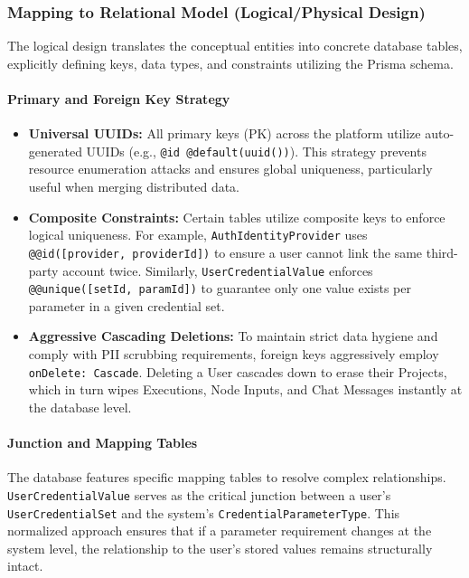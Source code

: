 \subsubsection{Mapping to Relational Model (Logical/Physical Design)}
The logical design translates the conceptual entities into concrete database tables, explicitly defining keys, data types, and constraints utilizing the Prisma schema.



\paragraph{Primary and Foreign Key Strategy}
\begin{itemize}
    \item \textbf{Universal UUIDs:} All primary keys (PK) across the platform utilize auto-generated UUIDs (e.g., \texttt{@id @default(uuid())}). This strategy prevents resource enumeration attacks and ensures global uniqueness, particularly useful when merging distributed data.
    \item \textbf{Composite Constraints:} Certain tables utilize composite keys to enforce logical uniqueness. For example, \texttt{AuthIdentityProvider} uses \texttt{@@id([provider, providerId])} to ensure a user cannot link the same third-party account twice. Similarly, \texttt{UserCredentialValue} enforces \texttt{@@unique([setId, paramId])} to guarantee only one value exists per parameter in a given credential set.
    \item \textbf{Aggressive Cascading Deletions:} To maintain strict data hygiene and comply with PII scrubbing requirements, foreign keys aggressively employ \texttt{onDelete: Cascade}. Deleting a User cascades down to erase their Projects, which in turn wipes Executions, Node Inputs, and Chat Messages instantly at the database level.
\end{itemize}

\paragraph{Junction and Mapping Tables}
The database features specific mapping tables to resolve complex relationships. \texttt{UserCredentialValue} serves as the critical junction between a user's \texttt{UserCredentialSet} and the system's \texttt{CredentialParameterType}. This normalized approach ensures that if a parameter requirement changes at the system level, the relationship to the user's stored values remains structurally intact.

